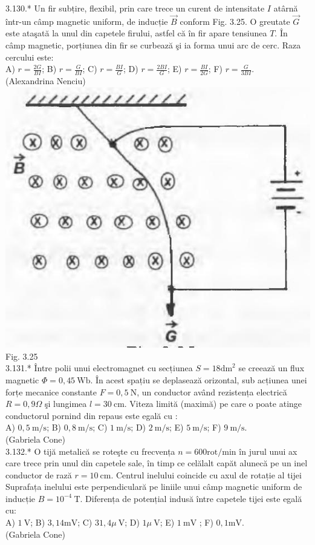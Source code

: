 3.130.* Un fir subțire, flexibil, prin care trece un curent de intensitate $I$ atârnă într-un câmp magnetic uniform, de inducție $\vec{B}$ conform Fig. 3.25. O greutate $\vec{G}$ este ataşată la unul din capetele firului, astfel că în fir apare tensiunea $T$. În câmp magnetic, porțiunea din fir se curbează şi ia forma unui arc de cerc. Raza cercului este:\\ A) $r=\frac{2 G}{B I}$; B) $r=\frac{G}{B I}$; C) $r=\frac{B I}{G}$; D) $r=\frac{2 B I}{G}$; E) $r=\frac{B I}{2 G}$; F) $r=\frac{G}{3 B I}$.\\ (Alexandrina Nenciu)\\ \includegraphics[width=0.4\linewidth]{images/2025_07_01_5b3ff9fa0d508c8e9f17g-172} Fig. 3.25\\

3.131.* Între polii unui electromagnet cu secțiunea $S=18 \mathrm{dm}^{2}$ se creează un flux magnetic $\Phi=0,45 \mathrm{~Wb}$. În acest spațiu se deplasează orizontal, sub acțiunea unei forțe mecanice constante $F=0,5 \mathrm{~N}$, un conductor având rezistența electrică $R=0,9 \Omega$ şi lungimea $l=30 \mathrm{~cm}$. Viteza limită (maximă) pe care o poate atinge conductorul pornind din repaus este egală cu :\\ A) $0,5 \mathrm{~m} / \mathrm{s}$; B) $0,8 \mathrm{~m} / \mathrm{s}$; C) $1 \mathrm{~m} / \mathrm{s}$; D) $2 \mathrm{~m} / \mathrm{s}$; E) $5 \mathrm{~m} / \mathrm{s}$; F) $9 \mathrm{~m} / \mathrm{s}$.\\ (Gabriela Cone)\\

3.132.* O tijă metalică se roteşte cu frecvența $n=600 \mathrm{rot} / \mathrm{min}$ în jurul unui ax care trece prin unul din capetele sale, în timp ce celălalt capăt alunecă pe un inel conductor de rază $r=10 \mathrm{~cm}$. Centrul inelului coincide cu axul de rotație al tijei Suprafața inelului este perpendiculară pe liniile unui câmp magnetic uniform de inducție $B=10^{-4} \mathrm{~T}$. Diferența de potențial indusă între capetele tijei este egală cu:\\ A) $1 \mathrm{~V}$; B) $3,14 \mathrm{mV}$; C) $31,4 \mu \mathrm{~V}$; D) $1 \mu \mathrm{~V}$; E) $1 \mathrm{~mV}$ ; F) $0,1 \mathrm{mV}$.\\ (Gabriela Cone)\\

